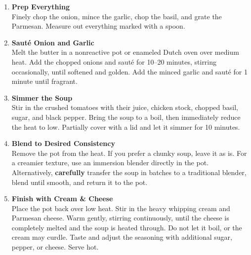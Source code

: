 \begin{enumerate}

      \item \textbf{Prep Everything} \\
            Finely chop the onion, mince the garlic, chop the basil, and grate the Parmesan. Measure out everything marked with a spoon.

      \item \textbf{Sauté Onion and Garlic} \\
            Melt the butter in a nonreactive pot or enameled Dutch oven over medium heat. Add the chopped onions and sauté for 10–20 minutes, stirring occasionally, until softened and golden. Add the minced garlic and sauté for 1 minute until fragrant.

      \item \textbf{Simmer the Soup} \\
            Stir in the crushed tomatoes with their juice, chicken stock, chopped basil, sugar, and black pepper. Bring the soup to a boil, then immediately reduce the heat to low. Partially cover with a lid and let it simmer for 10 minutes.

      \item \textbf{Blend to Desired Consistency} \\
            Remove the pot from the heat. If you prefer a chunky soup, leave it as is. For a creamier texture, use an immersion blender directly in the pot. Alternatively, \textbf{carefully} transfer the soup in batches to a traditional blender, blend until smooth, and return it to the pot.

      \item \textbf{Finish with Cream \& Cheese} \\
            Place the pot back over low heat. Stir in the heavy whipping cream and Parmesan cheese. Warm gently, stirring continuously, until the cheese is completely melted and the soup is heated through. Do not let it boil, or the cream may curdle. Taste and adjust the seasoning with additional sugar, pepper, or cheese. Serve hot.
\end{enumerate}

